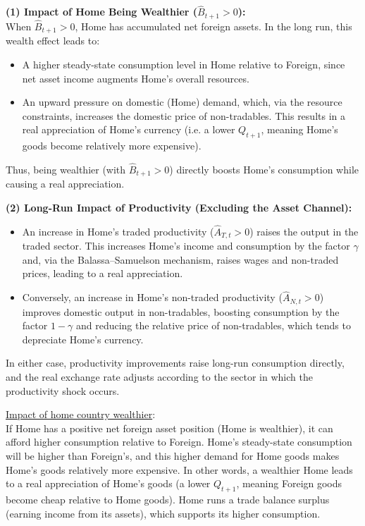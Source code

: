 \documentclass[a4paper,12pt]{article} %
\theoremstyle{nonitalic}
\begin{document}
\textbf{(1) Impact of Home Being Wealthier (\( \widehat{B}_{t+1} > 0 \)):}\\
When \( \widehat{B}_{t+1} > 0 \), Home has accumulated net foreign assets. In the long run, this wealth effect leads to:
\begin{itemize}
    \item A higher steady-state consumption level in Home relative to Foreign, since net asset income augments Home's overall resources.
    \item An upward pressure on domestic (Home) demand, which, via the resource constraints, increases the domestic price of non-tradables. This results in a real appreciation of Home's currency (i.e. a lower \( Q_{t+1} \), 
    meaning Home's goods become relatively more expensive).
\end{itemize}
Thus, being wealthier (with \( \widehat{B}_{t+1} > 0 \)) directly boosts Home's consumption while causing a real appreciation.

\textbf{(2) Long-Run Impact of Productivity (Excluding the Asset Channel):}\\
\begin{itemize}
    \item An increase in Home's traded productivity (\( \widehat{A}_{T,t} > 0 \)) raises the output in the traded sector. This increases Home's income and consumption by the factor \( \gamma \) and, via the Balassa--Samuelson mechanism, raises wages and non-traded prices, leading to a real appreciation.
    \item Conversely, an increase in Home's non-traded productivity (\( \widehat{A}_{N,t} > 0 \)) improves domestic output in non-tradables, boosting consumption by the factor \( 1-\gamma \) and reducing the relative price of non-tradables, which tends to depreciate Home's currency.
\end{itemize}
In either case, productivity improvements raise long-run consumption directly, and the real exchange rate adjusts according to the sector in which the productivity shock occurs.

\underline{Impact of home country wealthier}: \\
If Home has a positive net foreign asset position (Home is wealthier), 
it can afford higher consumption relative to Foreign. 
Home's steady-state consumption will be higher than Foreign's, 
and this higher demand for Home goods makes Home's goods relatively more expensive. 
In other words, a wealthier Home leads to a real appreciation of Home's goods (a lower $Q_{t+1}$, 
meaning Foreign goods become cheap relative to Home goods). 
Home runs a trade balance surplus (earning income from its assets), 
which supports its higher consumption.
\end{document}
